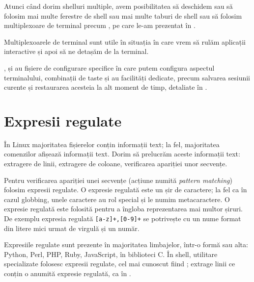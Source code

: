 Atunci când dorim shelluri multiple, avem posibilitatea să deschidem sau să
folosim mai multe ferestre de shell sau mai multe taburi de shell sau să
folosim multiplexoare de terminal precum ,  pe care le-am prezentat în
.

Multiplexoarele de terminal sunt utile în situația în care vrem să rulăm
aplicații interactive și apoi să ne detașăm de la terminal.

,  și  au fișiere de configurare specifice în care putem configura
aspectul terminalului, combinații de taste și au facilități dedicate, precum
salvarea sesiunii curente și restaurarea acesteia la alt moment de timp, detaliate în .

\section{Expresii regulate}
\label{sec:cli:regex}

În Linux majoritatea fișierelor conțin informații text; la fel, majoritatea
comenzilor afișează informații text. Dorim să prelucrăm aceste informații text:
extragere de linii, extragere de coloane, verificarea apariției unor secvențe.

Pentru verificarea apariției unei secvențe (acțiune numită \textit{pattern matching})
folosim expresii regulate. O expresie regulată este un șir de caractere; la fel ca în cazul globbing, unele
caractere au rol special și le numim metacaractere. O expresie regulată este
folosită pentru a îngloba reprezentarea mai multor șiruri. De exemplu expresia regulată \verb|[a-z]+,[0-9]+| se potrivește cu un nume format din litere mici urmat de virgulă și un număr.

Expresiile regulate sunt prezente în majoritatea limbajelor, într-o formă sau
alta: Python, Perl, PHP, Ruby, JavaScript, în biblioteci C. În shell, utilitare specializate folosesc expresii regulate, cel mai cunoscut fiind ; 
extrage linii ce conțin o anumită expresie regulată, ca în .

